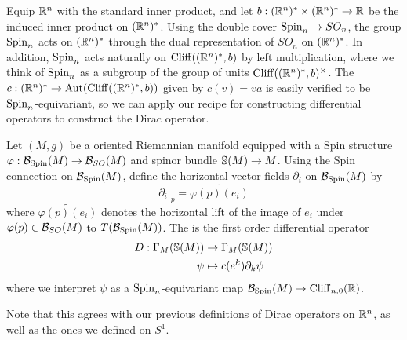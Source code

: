 Equip $\R^n$ with the standard inner product, and let
$b :(\R^n)^* \times (\R^n)^* \to \R$ be the induced inner product on $(\R^n)^*$.
Using the double cover $\Spin_n \to SO_n$, the group $\Spin_n$ acts on
$(\R^n)^*$ through the dual representation of $SO_n$ on $(\R^n)^*$. In addition,
$\Spin_n$ acts naturally on $\Cliff((\R^n)^*, b)$ by left multiplication, where
we think of $\Spin_n$ as a subgroup of the group of units
$\Cliff((\R^n)^*, b)^\times$. The 
$c : (\R^n)^* \to \Aut(\Cliff((\R^n)^*, b))$ given by $c(v) = va$ is easily
verified to be $\Spin_n$-equivariant, so we can apply our recipe for
constructing differential operators to construct the Dirac operator.
%
\begin{defn}
Let $(M,g)$ be a oriented Riemannian manifold equipped with a Spin structure
$\varphi : \B_{\Spin}(M) \to \B_{SO}(M)$ and spinor bundle $\S(M) \to M$.
Using the Spin connection on $\B_{\Spin}(M)$, define the horizontal
vector fields $\partial_i$ on $\B_{\Spin}(M)$ by
\[
\partial_i\vert_p = \widetilde{\varphi(p)(e_i)}
\]
where $\widetilde{\varphi(p)(e_i)}$ denotes the horizontal lift of the
image of $e_i$ under $\varphi(p) \in \B_{SO}(M)$ to $T(\B_{\Spin}(M))$.
The  is the first order differential operator
\begin{align*}
D : \Gamma_M(\S(M)) &\to \Gamma_M(\S(M)) \\
\psi &\mapsto c(e^k)\partial_k\psi
\end{align*}
where we interpret $\psi$ as a $\Spin_n$-equivariant map
$\B_{\Spin}(M) \to \Cliff_{n,0}(\R)$.
\end{defn}
%
Note that this agrees with our previous definitions of Dirac operators on $\R^n$,
as well as the ones we defined on $S^1$.
%